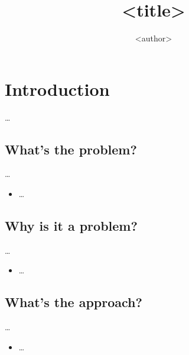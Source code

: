 \title{%
  <title>
}
\author{<author>}

\begin{frame}
  \maketitle
\end{frame}

\mode*

\begin{abstract}
  
\end{abstract}


\section{Introduction}

\dots

\subsection{What's the problem?}

\dots

\begin{frame}
  \begin{itemize}
    \item \dots
  \end{itemize}
\end{frame}

\subsection{Why is it a problem?}

\dots

\begin{frame}
  \begin{itemize}
    \item \dots
  \end{itemize}
\end{frame}

\subsection{What's the approach?}

\dots

\begin{frame}
  \begin{itemize}
    \item \dots
  \end{itemize}
\end{frame}

